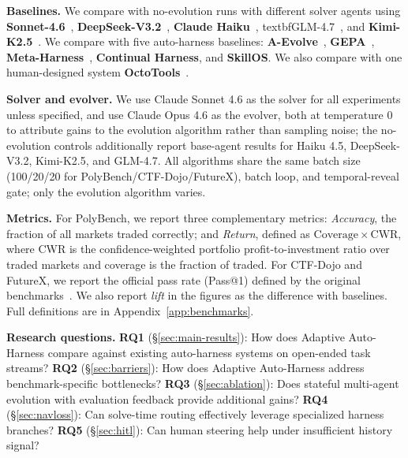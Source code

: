 \noindent\textbf{Baselines.} We compare with no-evolution runs with different solver agents using \textbf{Sonnet-4.6}~\cite{anthropic2025claude46}, \textbf{DeepSeek-V3.2}~\cite{deepseek2024v3}, \textbf{Claude Haiku}~\cite{anthropic2025haiku45}, textbf{GLM-4.7}~\cite{glm2024chatglm}, and \textbf{Kimi-K2.5}~\cite{moonshot2025kimik2}. We compare with five auto-harness baselines: \textbf{A-Evolve}~\cite{lin2026position}, \textbf{GEPA}~\cite{agrawal2025gepa}, \textbf{Meta-Harness}~\cite{lee2026meta}, \textbf{Continual Harness}, and \textbf{SkillOS}. We also compare with one human-designed system \textbf{OctoTools}~\cite{lu2025octotools}.


\noindent\textbf{Solver and evolver.} We use Claude Sonnet 4.6 as the solver for all experiments unless specified, and use Claude Opus 4.6 as the evolver, both at temperature 0 to attribute gains to the evolution algorithm rather than sampling noise; the no-evolution controls additionally report base-agent results for Haiku 4.5, DeepSeek-V3.2, Kimi-K2.5, and GLM-4.7. All algorithms share the same batch size (100/20/20 for PolyBench/CTF-Dojo/FutureX), batch loop, and temporal-reveal gate; only the evolution algorithm varies.

\noindent\textbf{Metrics.} For PolyBench, we report three complementary metrics: \emph{Accuracy}, the fraction of all markets traded correctly; and \emph{Return}, defined as $\mathrm{Coverage}\times\mathrm{CWR}$, where CWR is the confidence-weighted portfolio profit-to-investment ratio over traded markets and coverage is the fraction of traded. For CTF-Dojo and FutureX, we report the official pass rate (Pass@1) defined by the original benchmarks~\cite{zhuo2025training,zeng2025futurex}. We also report \emph{lift} in the figures as the difference with baselines. Full definitions are in Appendix~\ref{app:benchmarks}.



\noindent\textbf{Research questions.}
\textbf{RQ1} (\S\ref{sec:main-results}): How does Adaptive Auto-Harness compare against existing auto-harness systems on open-ended task streams?
\textbf{RQ2} (\S\ref{sec:barriers}): How does Adaptive Auto-Harness address benchmark-specific bottlenecks?
\textbf{RQ3} (\S\ref{sec:ablation}): Does stateful multi-agent evolution with evaluation feedback provide additional gains?
\textbf{RQ4} (\S\ref{sec:navloss}): Can solve-time routing effectively leverage specialized harness branches?
\textbf{RQ5} (\S\ref{sec:hitl}): Can human steering help under insufficient history signal?

